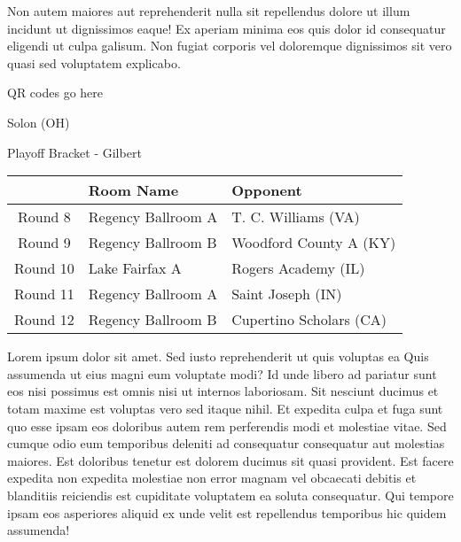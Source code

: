 \documentclass{article}%
\begin{document}
\newline%
Non autem maiores aut reprehenderit nulla sit repellendus dolore ut illum incidunt ut dignissimos eaque! Ex aperiam minima eos quis dolor id consequatur eligendi ut culpa galisum. Non fugiat corporis vel doloremque dignissimos sit vero quasi sed voluptatem explicabo.\newline%
\newline%
%
\vspace*{30pt}%
\begin{center}%
\begin{Huge}%
QR codes go here%
\end{Huge}%
\end{center}%
\newpage%
\begin{center}%
\begin{Huge}%
Solon (OH)%
\end{Huge}%
\vspace*{8pt}%
\linebreak%
\begin{Large}%
Playoff Bracket {-} Gilbert%
\end{Large}%
\end{center}%
\begin{tabularx}{\textwidth}{|c|Y|Y|}%
\hline%
&Room Name&Opponent\\%
\hline%
Round 8&Regency Ballroom A&T. C. Williams (VA)\\%
Round 9&Regency Ballroom B&Woodford County A (KY)\\%
Round 10&Lake Fairfax A&Rogers Academy (IL)\\%
Round 11&Regency Ballroom A&Saint Joseph (IN)\\%
Round 12&Regency Ballroom B&Cupertino Scholars (CA)\\%
\hline%
\end{tabularx}%
\vspace*{8pt}%
\linebreak%
\newline%
\newline%
Lorem ipsum dolor sit amet. Sed iusto reprehenderit ut quis voluptas ea Quis assumenda ut eius magni eum voluptate modi? Id unde libero ad pariatur sunt eos nisi possimus est omnis nisi ut internos laboriosam. Sit nesciunt ducimus et totam maxime est voluptas vero sed itaque nihil. Et expedita culpa et fuga sunt quo esse ipsam eos doloribus autem rem perferendis modi et molestiae vitae.\newline%
\newline%
Sed cumque odio eum temporibus deleniti ad consequatur consequatur aut molestias maiores. Est doloribus tenetur est dolorem ducimus sit quasi provident. Est facere expedita non expedita molestiae non error magnam vel obcaecati debitis et blanditiis reiciendis est cupiditate voluptatem ea soluta consequatur. Qui tempore ipsam eos asperiores aliquid ex unde velit est repellendus temporibus hic quidem assumenda!\newline%
\end{document}
